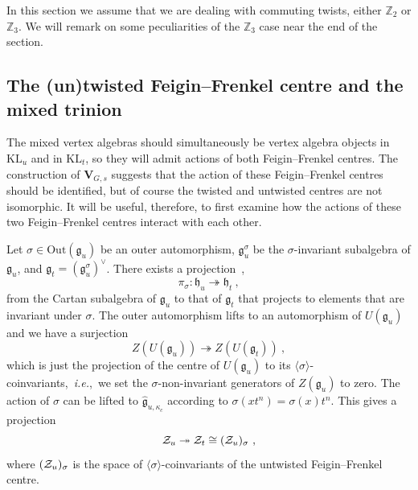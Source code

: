 \documentclass[a4paper]{article}
\def\IZ{\mathbb{Z}}
\def\ZZ{{\cal Z}}
\def\gf{\mathfrak{g}}
\def \ie{{\it i.e.}}
\def \KL{\mathrm{KL}}
\def\V{\mathbf{V}}
\begin{document}
In this section we assume that we are dealing with commuting twists, either $\IZ_2$ or $\IZ_3$. We will remark on some peculiarities of the $\IZ_3$ case near the end of the section.

\subsection{\label{subsec:twisted_untwisted_FF}The (un)twisted Feigin--Frenkel centre and the mixed trinion}

The mixed vertex algebras should simultaneously be vertex algebra objects in $\KL_u$ and in $\KL_t$, so they will admit actions of both Feigin--Frenkel centres. The construction of $\V_{G,s}$ suggests that the action of these Feigin--Frenkel centres should be identified, but of course the twisted and untwisted centres are not isomorphic. It will be useful, therefore, to first examine how the actions of these two Feigin--Frenkel centres interact with each other.

Let $\sigma\in\mathrm{Out}(\gf_u)$ be an outer automorphism, $\gf_u^\sigma$ be the $\sigma$-invariant subalgebra of $\gf_u$, and $\gf_t = \left( \gf_u^\sigma \right)^\vee$. There exists a projection~\cite{Fuchs1996},
\begin{equation}
	\pi_\sigma:\mathfrak{h}_u\twoheadrightarrow \mathfrak{h}_t~,
\end{equation}
from the Cartan subalgebra of $\gf_u$ to that of $\gf_t$ that projects to elements that are invariant under $\sigma$. The outer automorphism lifts to an automorphism of $U(\gf_u)$ and we have a surjection
\begin{equation}
	Z(U(\gf_u))\twoheadrightarrow Z(U(\gf_t))~,
\end{equation}
which is just the projection of the centre of $U(\gf_u)$ to its $\langle \sigma\rangle$-coinvariants,~\ie,~we set the $\sigma$-non-invariant generators of $Z(\gf_u)$ to zero. The action of $\sigma$ can be lifted to $\hat{\gf}_{u,\kappa_c}$ according to $\sigma(xt^n)=\sigma(x)t^n$. This gives a projection
\begin{equation}\label{eq:FF_projection}
	\ZZ_u \twoheadrightarrow \ZZ_t\cong (\ZZ_u)_\sigma~,
\end{equation}
where $(\ZZ_u)_\sigma$ is the space of $\langle\sigma\rangle$-coinvariants of the untwisted Feigin--Frenkel centre.
\end{document}
